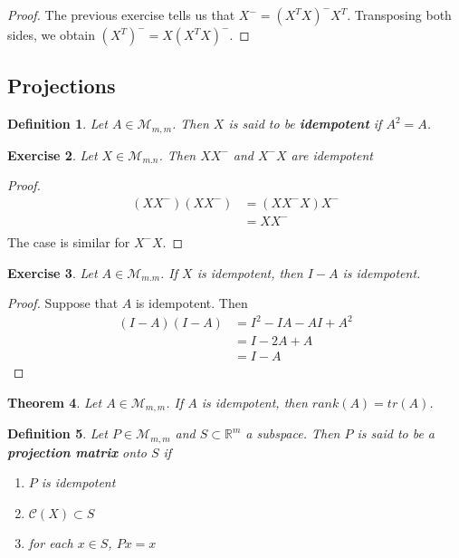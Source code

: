 \documentclass[12pt]{amsart}
\newtheorem{thm}{Theorem}[section]
\newtheorem{defn}[thm]{Definition}
\newtheorem{ex}[thm]{Exercise}
\newcommand{\R}{\mathbb{R}}
\newcommand{\MC}{\mathcal{C}}
\newcommand{\MM}{\mathcal{M}}
\begin{document}
\begin{proof}
The previous exercise tells us that $X^- = (X^TX)^-X^T$. Transposing both sides, we obtain $(X^T)^- = X(X^TX)^-$.
\end{proof}

\subsection{Projections}

\begin{defn}
Let $A \in \MM_{m,m}$. Then $X$ is said to be \textbf{idempotent} if $A^2 = A$.
\end{defn}

\begin{ex}
Let $X \in \MM_{m.n}$. Then $XX^-$ and $X^-X$ are idempotent
\end{ex}

\begin{proof}
\begin{align*}
(XX^-)(XX^-) 
&= (XX^-X)X^- \\
&= XX^-\\
\end{align*} The case is similar for $X^-X$.
\end{proof}

\begin{ex}
Let $A \in \MM_{m.m}$. If $X$ is idempotent, then $I-A$ is idempotent.
\end{ex}

\begin{proof} 
Suppose that $A$ is idempotent. Then
\begin{align*}
(I-A)(I-A) 
&= I^2 -IA -AI + A^2 \\
&= I -2A +A \\
&= I -A
\end{align*}
\end{proof}

\begin{thm}
Let $A \in \MM_{m,m}$. If $A$ is idempotent, then $rank(A) = tr(A)$.
\end{thm}

\begin{defn}
Let $P \in \MM_{m,m}$ and $S \subset \R^m$ a subspace. Then $P$ is said to be a \textbf{projection matrix} onto $S$ if 
\begin{enumerate}
\item $P$ is idempotent
\item $\MC(X) \subset S$ 
\item for each $x \in S$, $Px = x$
\end{enumerate} 
\end{defn}
\end{document}
